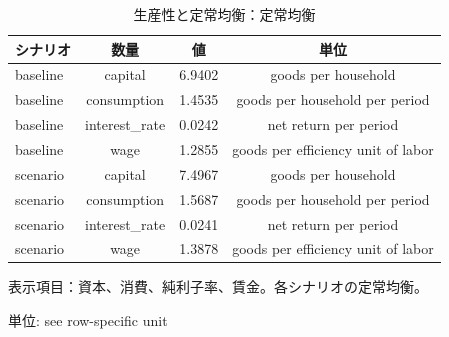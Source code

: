 \begingroup
\begin{table}[htbp]
\centering
\caption{生産性と定常均衡：定常均衡}
\label{tab:specialist-aiyagari-r01-displays-equilibrium}
\begin{tabular}{lccc}
\toprule
シナリオ & 数量 & 値 & 単位 \\
\midrule
baseline & capital & 6.9402 & goods per household \\
baseline & consumption & 1.4535 & goods per household per period \\
baseline & interest\_rate & 0.0242 & net return per period \\
baseline & wage & 1.2855 & goods per efficiency unit of labor \\
scenario & capital & 7.4967 & goods per household \\
scenario & consumption & 1.5687 & goods per household per period \\
scenario & interest\_rate & 0.0241 & net return per period \\
scenario & wage & 1.3878 & goods per efficiency unit of labor \\
\bottomrule
\end{tabular}
\par\medskip\begin{minipage}{\linewidth}\footnotesize
表示項目：資本、消費、純利子率、賃金。各シナリオの定常均衡。\par 単位: see row-specific unit
\end{minipage}
\end{table}
\endgroup
